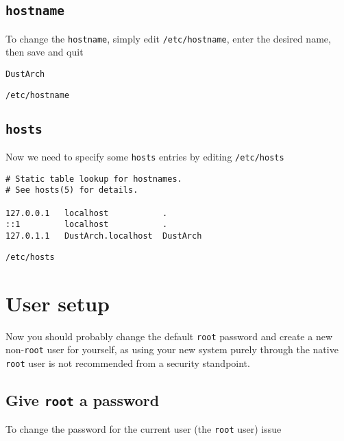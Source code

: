 \documentclass[10pt]{dustdoc}
\begin{document}
\subsection{\texttt{hostname}}%
\label{sec:hostname}

To change the \texttt{hostname}, simply edit \texttt{/etc/hostname}, enter the desired name, then save and quit

\begin{mintedlisting}
    \begin{verbatim}
DustArch
    \end{verbatim}

    \caption{\texttt{/etc/hostname}}
\end{mintedlisting}

\subsection{\texttt{hosts}}%
\label{sec:hosts}

Now we need to specify some \texttt{hosts} entries by editing \texttt{/etc/hosts}

\begin{mintedlisting}
    \begin{verbatim}
# Static table lookup for hostnames.
# See hosts(5) for details.

127.0.0.1   localhost           .
::1         localhost           .
127.0.1.1   DustArch.localhost  DustArch
    \end{verbatim}

    \caption{\texttt{/etc/hosts}}
\end{mintedlisting}

\section{User setup}%
\label{sec:user-setup}

Now you should probably change the default \texttt{root} password and create a new non-\texttt{root} user for yourself, as using your new system purely through the native \texttt{root} user is not recommended from a security standpoint.

\subsection{Give \texttt{root} a password}%
\label{sec:give-root-a-password}

To change the password for the current user (the \texttt{root} user) issue
\end{document}
